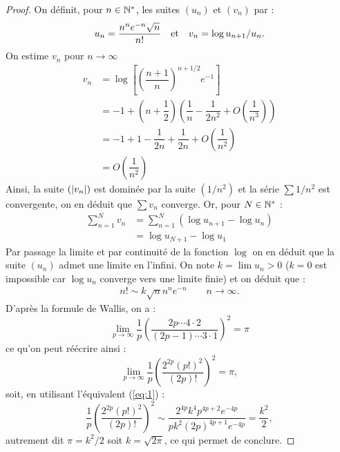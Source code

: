 \begin{proof}
On définit, pour $n \in \mathbb{N}^\ast$, les suites $(u_n)$ et $(v_n)$ par :
\[ u_n = \dfrac{n^ne^{-n}\sqrt{n}}{n!} \quad \text{et} \quad v_n=\log{u_{n+1}/u_n} . \]
On estime $v_n$ pour $n \to \infty$
\begin{align*}
v_n & = \log \left [ \left ( \dfrac{n+1}{n} \right )^{n+1/2} e^{-1} \right ] \\
& = -1 + \left ( n+\dfrac12 \right ) \left ( \dfrac1{n} - \dfrac1{2n^2} + O \left ( \dfrac1{n^3} \right ) \right ) \\
& = -1 + 1 -  \dfrac1{2n} + \dfrac1{2n} + O  \left ( \dfrac1{n^2} \right ) \\
& = O  \left ( \dfrac1{n^2} \right )
\end{align*}
Ainsi, la suite $(\lvert v_n\rvert)$ est dominée par la suite $(1/n^2)$ et la série $\sum 1/n^2$ est convergente, on en déduit que $\sum v_n$
converge. Or, pour $N \in \mathbb{N}^\ast$ :
\begin{align*}
\sum_{n=1}^{N} v_n & =  \sum_{n=1}^{N} ( \log{u_{n+1}} - \log{u_n} ) \\
& = \log{u_{N+1}} - \log{u_1}
\end{align*}
Par passage la limite et par continuité de la fonction $\log$ on en déduit que la suite $(u_n)$ admet une limite en l'infini.
On note $k = \lim{u_n} > 0$ ($k=0$ est impossible car $\log{u_n}$ converge vers une limite finie) et on déduit que :
\begin{align} n! \sim k \sqrt{n} n^n e^{-n} \qquad n \to \infty . \label{eq:1} \end{align}
D'après la formule de Wallis, on a :
\[ \lim_{p \to \infty} \dfrac1{p} \left ( \dfrac{2p \cdots 4 \cdot 2}{(2p-1) \cdots 3 \cdot 1} \right )^2 = \pi \]
ce qu'on peut réécrire ainsi :
\[ \lim_{p \to \infty} \dfrac1{p} \left ( \dfrac{2^{2p} (p!)^2}{(2p)!} \right )^2 = \pi , \]
soit, en utilisant l'équivalent (\ref{eq:1}) : 
\[ \dfrac1{p} \left ( \dfrac{2^{2p} (p!)^2}{(2p)!} \right )^2 \sim \dfrac{2^{4p}k^4p^{4p+2}e^{-4p}}{pk^2(2p)^{4p+1}e^{-4p}}
= \dfrac{k^2}2 , \]
autrement dit $\pi = k^2/2$ soit $k=\sqrt{2\pi}$, ce qui permet de conclure.
\end{proof}

